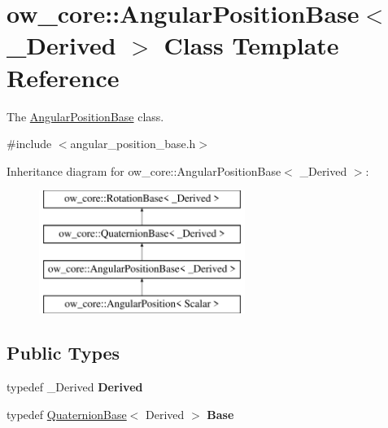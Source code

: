 \hypertarget{classow__core_1_1AngularPositionBase}{}\section{ow\+\_\+core\+:\+:Angular\+Position\+Base$<$ \+\_\+\+Derived $>$ Class Template Reference}
\label{classow__core_1_1AngularPositionBase}


The \hyperlink{classow__core_1_1AngularPositionBase}{Angular\+Position\+Base} class.  




{\ttfamily \#include $<$angular\+\_\+position\+\_\+base.\+h$>$}

Inheritance diagram for ow\+\_\+core\+:\+:Angular\+Position\+Base$<$ \+\_\+\+Derived $>$\+:\begin{figure}[H]
\begin{center}
\leavevmode
\includegraphics[height=4.000000cm]{d7/db5/classow__core_1_1AngularPositionBase}
\end{center}
\end{figure}
\subsection*{Public Types}
\begin{DoxyCompactItemize}
\item 
typedef \+\_\+\+Derived {\bfseries Derived}\hypertarget{classow__core_1_1AngularPositionBase_a661904f1181d786198cdb44023b7f9ca}{}\label{classow__core_1_1AngularPositionBase_a661904f1181d786198cdb44023b7f9ca}

\item 
typedef \hyperlink{classow__core_1_1QuaternionBase}{Quaternion\+Base}$<$ Derived $>$ {\bfseries Base}\hypertarget{classow__core_1_1AngularPositionBase_a402ae58951e61154543a545a6bd29c28}{}\label{classow__core_1_1AngularPositionBase_a402ae58951e61154543a545a6bd29c28}

\end{DoxyCompactItemize}
